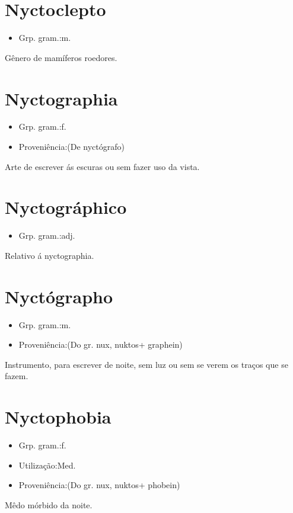 \section{Nyctoclepto}
\begin{itemize}
\item {Grp. gram.:m.}
\end{itemize}
Gênero de mamíferos roedores.
\section{Nyctographia}
\begin{itemize}
\item {Grp. gram.:f.}
\end{itemize}
\begin{itemize}
\item {Proveniência:(De \textunderscore nyctógrafo\textunderscore )}
\end{itemize}
Arte de escrever ás escuras ou sem fazer uso da vista.
\section{Nyctográphico}
\begin{itemize}
\item {Grp. gram.:adj.}
\end{itemize}
Relativo á nyctographia.
\section{Nyctógrapho}
\begin{itemize}
\item {Grp. gram.:m.}
\end{itemize}
\begin{itemize}
\item {Proveniência:(Do gr. \textunderscore nux\textunderscore , \textunderscore nuktos\textunderscore  + \textunderscore graphein\textunderscore )}
\end{itemize}
Instrumento, para escrever de noite, sem luz ou sem se verem os traços que se fazem.
\section{Nyctophobia}
\begin{itemize}
\item {Grp. gram.:f.}
\end{itemize}
\begin{itemize}
\item {Utilização:Med.}
\end{itemize}
\begin{itemize}
\item {Proveniência:(Do gr. \textunderscore nux\textunderscore , \textunderscore nuktos\textunderscore  + \textunderscore phobein\textunderscore )}
\end{itemize}
Mêdo mórbido da noite.
